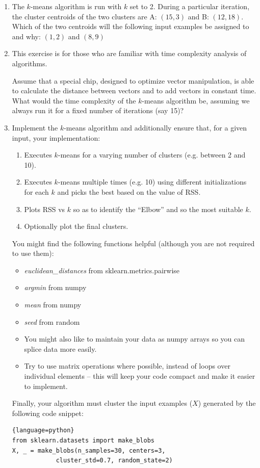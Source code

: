 \begin{enumerate}

\item The $k$-means algorithm is run with $k$ set to 2. During a particular iteration, the cluster centroids of the two clusters are A: $(15, 3)$ and B: $(12, 18)$. Which of the two centroids will the following input examples be assigned to and why: $(1, 2)$ and $(8, 9)$ 

\item This exercise is for those who are familiar with time complexity analysis of algorithms.

Assume that a special chip, designed to optimize vector manipulation, is able to calculate the distance between vectors and to add vectors in constant time. What would the time complexity of the $k$-means algorithm be, assuming we always run it for a fixed number of iterations (say 15)?

\item  Implement the $k$-means algorithm and additionally ensure that, for a given input, your implementation: 
    \begin{enumerate}
        \item Executes $k$-means for a varying number of clusters (e.g. between 2 and 10).
        \item Executes $k$-means multiple times (e.g. 10) using different initializations for each $k$ and picks the best based on the value of RSS. 
        \item Plots RSS vs $k$ so as to identify the ``Elbow'' and so the most suitable $k$. 
        \item Optionally plot the final clusters.
    \end{enumerate}
    You might find the following functions helpful (although you are not required to use them): 
    \begin{itemize}
        \item \emph{euclidean\_distances} from sklearn.metrics.pairwise
        \item \emph{argmin} from numpy
        \item \emph{mean} from numpy 
        \item \emph{seed} from random
        \item You might also like to maintain your data as numpy arrays so you can splice data more easily. 
        \item Try to use matrix operations where possible, instead of loops over individual elements -- this will keep your code compact and make it easier to implement.
    \end{itemize}
    Finally, your algorithm must cluster the input examples ($X$) generated by the following code snippet: 

\begin{lstlisting}{language=python}
from sklearn.datasets import make_blobs
X, _ = make_blobs(n_samples=30, centers=3, 
            cluster_std=0.7, random_state=2)
\end{lstlisting}
\end{enumerate}

